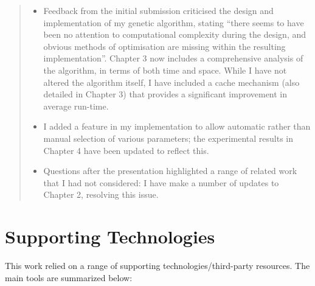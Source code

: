 \documentclass[ %
                    author={Revalda Putawara},
                supervisor={Dr. James Pope},
                    degree={MSc},
                     title={Robustness of Bayesian Neural Networks Design Choices Against Weight and Bias Perturbation Induced by Single Event Upsets (SEUs)},
                      type={},
                      year={2025}]{dissertation}
\begin{document}
\begin{quote}
\noindent
\begin{itemize}
\item Feedback from the initial submission criticised the design and 
      implementation of my genetic algorithm, stating ``there seems 
      to have been no attention to computational complexity during the
      design, and obvious methods of optimisation are missing within
      the resulting implementation''.  Chapter 3 now includes a
      comprehensive analysis of the algorithm, in terms of both time
      and space.  While I have not altered the algorithm itself, I
      have included a cache mechanism (also detailed in Chapter 3)
      that provides a significant improvement in average run-time.
\item I added a feature in my implementation to allow automatic rather
      than manual selection of various parameters; the experimental
      results in Chapter 4 have been updated to reflect this.
\item Questions after the presentation highlighted a range of related
      work that I had not considered: I have make a number of updates 
      to Chapter 2, resolving this issue.
\end{itemize}
\end{quote}
\fi


\chapter*{Supporting Technologies}



This work relied on a range of supporting technologies/third-party resources. The main tools are summarized below:
\end{document}
